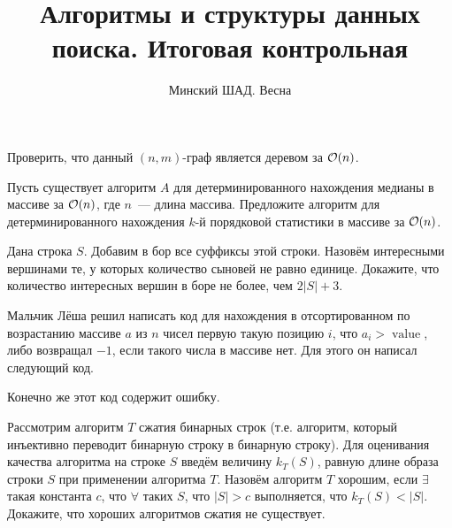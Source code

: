 \documentclass[addpoints]{exam}
\title{Алгоритмы и структуры данных поиска. Итоговая контрольная}
\author{Минский ШАД. Весна}
\DeclareMathOperator{\myvalue}{value}
\begin{document}
\maketitle

\begin{questions}

\question[1 \half] Проверить, что данный $(n,m)$-граф является деревом за $\mathcal{O}(n)$.

\question[1 \half] Пусть существует алгоритм $A$ для детерминированного нахождения медианы в массиве за $\mathcal{O}(n)$, где $n$~--- длина массива. Предложите алгоритм для детерминированного нахождения $k$-й порядковой статистики в массиве за $\mathcal{O}(n)$.

\question[2] Дана строка $S$. Добавим в бор все суффиксы этой строки. Назовём интересными вершинами те, у которых количество сыновей не равно единице. Докажите, что количество интересных вершин в боре не более, чем $2|S| + 3$.

\question Мальчик Лёша решил написать код для нахождения в отсортированном по возрастанию массиве $a$ из $n$ чисел первую такую позицию $i$, что $a_i > \myvalue$, либо возвращал $-1$, если такого числа в массиве нет. Для этого он написал следующий код.



Конечно же этот код содержит ошибку. 

 
\question[2] Рассмотрим алгоритм $T$ сжатия бинарных строк (т.е. алгоритм, который инъективно переводит бинарную строку в бинарную строку). Для оценивания качества алгоритма на строке $S$ введём величину $k_T(S)$, равную длине образа строки $S$ при применении алгоритма $T$. Назовём алгоритм $T$ хорошим, если $\exists$ такая константа $c$, что $\forall$ таких $S$, что $|S| > c$ выполняется, что $k_T(S) < |S|$. Докажите, что хороших алгоритмов сжатия не существует.


\end{questions}
\end{document}
